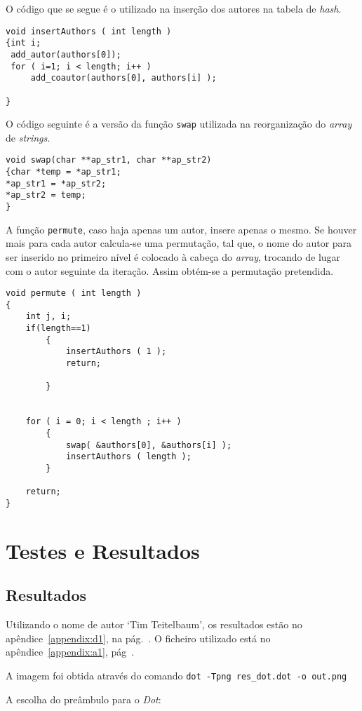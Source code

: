 O código que se segue é o utilizado na inserção dos autores na tabela de
\emph{hash}. 

\begin{Verbatim}
void insertAuthors ( int length )
{int i;
 add_autor(authors[0]);
 for ( i=1; i < length; i++ )
     add_coautor(authors[0], authors[i] );
 				
}
\end{Verbatim}

O código seguinte é a versão da função \texttt{swap} utilizada na reorganização
do \emph{array} de \emph{strings}. 
\begin{Verbatim}
void swap(char **ap_str1, char **ap_str2)
{char *temp = *ap_str1;
*ap_str1 = *ap_str2;
*ap_str2 = temp;
}
\end{Verbatim}

A função \texttt{permute}, caso haja apenas um autor, insere apenas o mesmo. Se
houver mais para cada autor calcula-se uma permutação, tal que, o nome do autor
para ser inserido no primeiro nível é colocado à cabeça do \emph{array},
trocando de lugar com o autor seguinte da iteração. Assim obtém-se a permutação
pretendida.
\begin{Verbatim}
void permute ( int length )
{
    int j, i;
    if(length==1)
        {
            insertAuthors ( 1 );
            return;

        }


    for ( i = 0; i < length ; i++ )
        {
            swap( &authors[0], &authors[i] );
            insertAuthors ( length );
        }

    return;
}
\end{Verbatim}

\section{Testes e Resultados}
\label{sec:ts:c}


\subsection{Resultados}

Utilizando o nome de autor `Tim Teitelbaum', os resultados estão no
apêndice~\ref{appendix:d1}, na pág.~\pageref{appendix:d1}. O ficheiro
 utilizado está no apêndice~\ref{appendix:a1},
pág~\pageref{listing:a2}.

A imagem foi obtida através do comando \verb|dot -Tpng res_dot.dot -o out.png| 

A escolha do preâmbulo para o \emph{Dot}:

